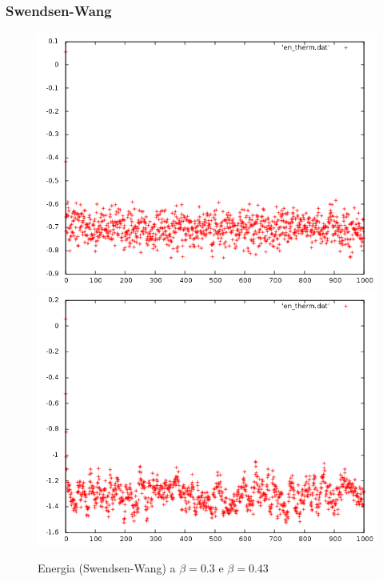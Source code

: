 \subsubsection*{Swendsen-Wang}
\begin{figure}[h]
\includegraphics[scale=0.35]{sw/en_therm0-3.png}
\includegraphics[scale=0.35]{sw/en_therm0-43.png}
\caption{Energia (Swendsen-Wang) a $\beta=0.3$ e $\beta=0.43$}
\end{figure}

